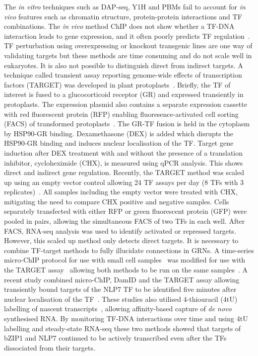 \documentclass[../main.tex]{subfiles}
\begin{document}
The \textit{in vitro} techniques such as DAP-seq, Y1H and PBMs fail to account for \textit{in vivo} features such as chromatin structure, protein-protein interactions and TF combinations.
The \textit{in vivo} method ChIP does not show whether a TF-DNA interaction leads to gene expression, and it often poorly predicts TF regulation~\autocite{brooksNetworkWalkingCharts2019}.
TF perturbation using overexpressing or knockout transgenic lines are one way of validating targets but these methods are time consuming and do not scale well in eukaryotes.
It is also not possible to distinguish direct from indirect targets.
A technique called transient assay reporting genome\hyp{}wide effects of transcription factors (TARGET) was developed in plant protoplasts~\autocite{bargmannTARGETTransientTransformation2013}.
Briefly, the TF of interest is fused to a glucocorticoid receptor (GR) and expressed transiently in protoplasts.
The expression plasmid also contains a separate expression cassette with red fluorescent protein (RFP) enabling fluoresence\hyp{}activated cell sorting (FACS) of transformed protoplasts~\autocite{bargmannFluorescenceActivatedCell2010}.
The GR-TF fusion is held in the cytoplasm by HSP90-GR binding. Dexamethasone (DEX) is added which disrupts the HSP90-GR binding and induces nuclear localisation of the TF.
Target gene induction after DEX treatment with and without the presence of a translation inhibitor, cycloheximide (CHX), is measured using qPCR analysis.
This shows direct and indirect gene regulation.
Recently, the TARGET method was scaled up using an empty vector control allowing 24 TF assays per day (8 TFs with 3 replicates)~\autocite{brooksNetworkWalkingCharts2019}.
All samples including the empty vector were treated with CHX, mitigating the need to compare CHX positive and negative samples.
Cells separately transfected with either RFP or green fluorescent protein (GFP) were pooled in pairs, allowing the simultaneous FACS of two TFs in each well.
After FACS, RNA-seq analysis was used to identify activated or repressed targets.
However, this scaled up method only detects direct targets.
It is necessary to combine TF-target methods to fully illucidate connections in GRNs.
A time\hyp{}series micro-ChIP protocol for use with small cell samples~\autocite{dahlMChIPRapidMicro2008} was modified for use with the TARGET assay~\autocite{paraMChIPSeqGenomeWideMapping2018} allowing both methods to be run on the same samples~\autocite{paraHitandrunTranscriptionalControl2014, doidyHitandRunTranscriptionNovo2016}.
A recent study combined micro-ChIP, DamID and the TARGET assay allowing transiently bound targets of the NLP7 TF to be identified five minutes after nuclear localisation of the TF~\autocite{alvarezTransientGenomewideInteractions2020}.
These studies also utilised 4-thiouracil (4tU) labelling of nascent transcripts~\autocite{sidaway-leeDirectMeasurementTranscription2014}, allowing affinity-based capture of \textit{de novo} synthesised RNA.
By monitoring TF-DNA interactions over time and using 4tU labelling and steady\hyp{}state RNA-seq these two methods showed that targets of bZIP1 and NLP7 continued to be actively transcribed even after the TFs dissociated from their targets.
\end{document}
